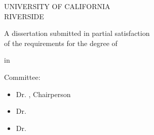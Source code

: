 \begin{titlepage}
    \begin{center}
    \null
        \vspace{0.2in} %
    
        UNIVERSITY OF CALIFORNIA \\
        RIVERSIDE
        
        \vfill
        
        \Title 
        
        \vspace{0.3in}
        
        A dissertation submitted in partial satisfaction\\
        of the requirements for the degree of
        
        
        \vspace{0.3in}
        
        \Degree
        
        \vspace{0.3in}
        in 
        \vspace{0.3in}
        
        \FieldofStudy
        
        \vspace{0.3in}
        
        \Author
        
        \vspace{0.3in}
        
        \ConferralDate 

    \end{center}
        \vspace{0.3in}
        
        \DocumentType{} Committee:
        
        \begin{itemize}
        \setlength\itemsep{0.0em}
            \item[] Dr. {\CommChair}, Chairperson 
            \item[] Dr. {\CommMembtwo}
            \item[] Dr. {\CommMembthree}
        \end{itemize}
        

\end{titlepage}